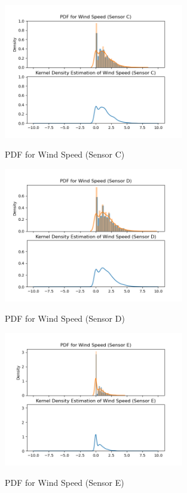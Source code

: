 \documentclass[a4paper,12pt]{article}
\begin{document}
  \begin{figure}[H] 
	\centering
	\includegraphics[width=0.7\textwidth]{PDF for Wind Speed (Sensor C).png}
	\caption{PDF for Wind Speed (Sensor C)}\cite{Maiullari2020}
  \end{figure}
  \begin{figure}[H] 
	\centering
	\includegraphics[width=0.7\textwidth]{PDF for Wind Speed (Sensor D).png}
	\caption{PDF for Wind Speed (Sensor D)}\cite{Maiullari2020}
  \end{figure}
  \begin{figure}[H] 
	\centering
	\includegraphics[width=0.7\textwidth]{PDF for Wind Speed (Sensor E).png}
	\caption{PDF for Wind Speed (Sensor E)}\cite{Maiullari2020}
  \end{figure}
\end{document}
